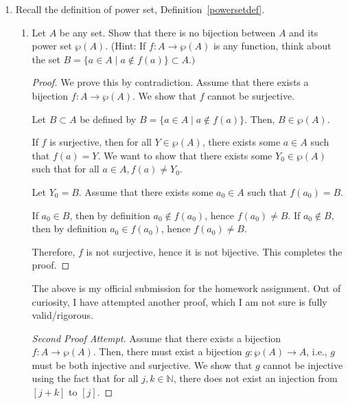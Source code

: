 \documentclass[11pt]{article}
\newcommand{\bbN}{\mathbb{N}}
\theoremstyle{definition}
\numberwithin{equation}{subsection}
\begin{document}
\begin{enumerate}
\begin{proof}
Let $Y \subset B = \{b_1, b_2, \dots, b_n\}$, then we have that the preimage $f^{-1}(Y)=\{a_{b1}, a_{b2}, \dots, a_{bn}\}$. 

By the definition of $g$, the image of $Y$ under the map $g$ is $g(Y)=a_b$ for all $b \in Y$. Hence, $g(Y)=\{a_{b1}, a_{b2}, \dots, a_{bn}\}$.

This completes the proof.

\renewcommand\qedsymbol{QED}
\end{proof}








\item Recall the definition of power set, Definition~\ref{powersetdef}.
\begin{enumerate}
\item Let $A$ be any set.  Show that there is no bijection between $A$ and its power set $\wp(A).$
(Hint:  If $f:A\rightarrow \wp(A)$ is any function, think about the set
$B=\{a\in A\mid a\not\in f(a)\}\subset A.)$
\begin{proof}
We prove this by contradiction. Assume that there exists a bijection $f:A\rightarrow \wp(A)$. We show that $f$ cannot be surjective.

Let $B \subset A$ be defined by $B=\{a\in A\mid a\not\in f(a)\}$. Then, $B \in \wp(A)$. 

If $f$ is surjective, then for all $Y \in \wp(A)$, there exists some $a \in A$ such that $f(a)=Y$. We want to show that there exists some $Y_0 \in \wp(A)$ such that for all $a \in A, f(a) \not = Y_0$.

Let $Y_0 = B$. Assume that there exists some $a_0 \in A$ such that $f(a_0) = B$. 

If $a_0 \in B$, then by definition $a_0 \notin f(a_0)$, hence $f(a_0) \not = B$. If $a_0 \notin B$, then by definition $a_0 \in f(a_0)$, hence $f(a_0) \not = B$.

Therefore, $f$ is not surjective, hence it is not bijective. This completes the proof.


\renewcommand\qedsymbol{QED}
\end{proof}

The above is my official submission for the homework assignment. Out of curiosity, I have attempted another proof, which I am not sure is fully valid/rigorous. 

\begin{proof}[Second Proof Attempt]
Assume that there exists a bijection $f \colon A \rightarrow \wp(A)$. Then, there must exist a bijection $g \colon \wp(A) \rightarrow A$, i.e., $g$ must be both injective and surjective. We show that $g$ cannot be injective using the fact that for all $j,k \in \bbN$, there does not exist an injection from $[j+k]$ to $[j]$.


\end{proof}
\end{enumerate}
\end{enumerate}
\end{document}
